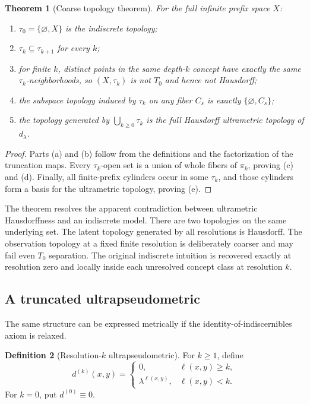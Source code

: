 \documentclass[11pt]{article}
\newtheorem{theorem}{Theorem}[section]
\theoremstyle{definition}
\newtheorem{definition}[theorem]{Definition}
\theoremstyle{remark}
\newcommand{\cyl}[1]{C_{#1}}
\begin{document}
\begin{theorem}[Coarse topology theorem]\label{thm:coarsetop}
For the full infinite prefix space $X$:
\begin{enumerate}[label=(\alph*)]
\item $\tau_0=\{\varnothing,X\}$ is the indiscrete topology;
\item $\tau_k\subseteq\tau_{k+1}$ for every $k$;
\item for finite $k$, distinct points in the same depth-$k$ concept have exactly the same $\tau_k$-neighborhoods, so $(X,\tau_k)$ is not $T_0$ and hence not Hausdorff;
\item the subspace topology induced by $\tau_k$ on any fiber $\cyl{s}$ is exactly $\{\varnothing,\cyl{s}\}$;
\item the topology generated by $\bigcup_{k\ge 0}\tau_k$ is the full Hausdorff ultrametric topology of $d_\lambda$.
\end{enumerate}
\end{theorem}

\begin{proof}
Parts (a) and (b) follow from the definitions and the factorization of the truncation maps.  Every $\tau_k$-open set is a union of whole fibers of $\pi_k$, proving (c) and (d).  Finally, all finite-prefix cylinders occur in some $\tau_k$, and those cylinders form a basis for the ultrametric topology, proving (e).
\end{proof}

The theorem resolves the apparent contradiction between ultrametric Hausdorffness and an indiscrete model.  There are two topologies on the same underlying set.  The latent topology generated by all resolutions is Hausdorff.  The observation topology at a fixed finite resolution is deliberately coarser and may fail even $T_0$ separation.  The original indiscrete intuition is recovered exactly at resolution zero and locally inside each unresolved concept class at resolution $k$.

\subsection{A truncated ultrapseudometric}

The same structure can be expressed metrically if the identity-of-indiscernibles axiom is relaxed.

\begin{definition}[Resolution-$k$ ultrapseudometric]
For $k\ge 1$, define
\[
d^{(k)}(x,y)=
\begin{cases}
0,&\ell(x,y)\ge k,\\
\lambda^{\ell(x,y)},&\ell(x,y)<k.
\end{cases}
\]
For $k=0$, put $d^{(0)}\equiv 0$.
\end{definition}
\end{document}
